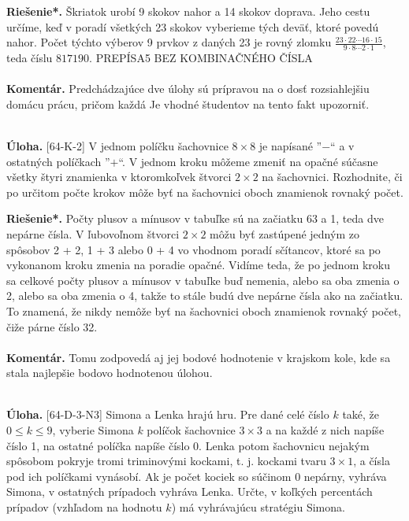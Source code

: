 \documentclass[11pt,a4paper,oneside,final]{book}
\newcommand{\kom}{\textbf{Komentár.} }
\newcommand{\ul}{\textbf{Úloha.} }
\newcommand{\rieh}{\textbf{Riešenie*.} }
\begin{document}
\rieh Škriatok urobí 9 skokov nahor a 14 skokov doprava. Jeho cestu určíme, keď v poradí všetkých 23 skokov vyberieme tých deväť, ktoré povedú nahor. Počet týchto výberov 9 prvkov z daných 23 je rovný zlomku $\frac{23 \cdot 22 \cdots 16 \cdot 15}{9 \cdot 8 \cdots2\cdot 1}$, teda číslu $817 190$. PREPÍSA5 BEZ KOMBINAČNÉHO ČÍSLA\\
\\
\kom Predchádzajúce dve úlohy sú prípravou na o dosť rozsiahlejšiu domácu prácu, pričom každá Je vhodné študentov na tento fakt upozorniť.\\
\\
\begin{tcolorbox}[breakable,notitle,boxrule=0pt,colback=light-gray,colframe=light-gray]\ul [64-K-2] V jednom políčku šachovnice $8 \times 8$ je napísané ”$-$“ a v ostatných políčkach ”$+$“. V jednom kroku môžeme zmeniť na opačné súčasne všetky štyri znamienka v ktoromkoľvek štvorci $2 \times 2$ na šachovnici. Rozhodnite, či po určitom počte krokov môže byť na šachovnici oboch znamienok rovnaký počet.

\end{tcolorbox}

\rieh Počty plusov a mínusov v tabuľke sú na začiatku 63 a 1, teda dve nepárne čísla. V ľubovoľnom štvorci $2 \times 2$ môžu byť zastúpené jedným zo spôsobov 2 + 2, 1 + 3 alebo 0 + 4 vo vhodnom poradí sčítancov, ktoré sa po vykonanom kroku zmenia na poradie opačné. Vidíme teda, že po jednom kroku sa celkové počty plusov a mínusov v tabuľke buď nemenia, alebo sa oba zmenia o 2, alebo sa oba zmenia o 4, takže to stále budú dve nepárne čísla ako na začiatku. To znamená, že nikdy nemôže byť na šachovnici oboch znamienok rovnaký počet, čiže párne číslo 32.\\
\\
\kom Tomu zodpovedá aj jej bodové hodnotenie v krajskom kole, kde sa stala najlepšie bodovo hodnotenou úlohou.\\
\\
\begin{tcolorbox}[breakable,notitle,boxrule=0pt,colback=light-gray,colframe=light-gray]\ul [64-D-3-N3] Simona a Lenka hrajú hru. Pre dané celé číslo $k$ také, že $0 \leq k \leq 9$, vyberie Simona $k$ políčok šachovnice $3 \times 3$ a na každé z nich napíše číslo 1, na ostatné políčka napíše číslo 0. Lenka potom šachovnicu nejakým spôsobom pokryje tromi triminovými kockami, t. j. kockami tvaru $3\times1$, a čísla pod ich políčkami vynásobí. Ak je počet kociek so súčinom 0 nepárny, vyhráva Simona, v ostatných prípadoch vyhráva Lenka. Určte, v koľkých percentách prípadov (vzhľadom na hodnotu $k$) má vyhrávajúcu stratégiu Simona.

\end{tcolorbox}
\end{document}
